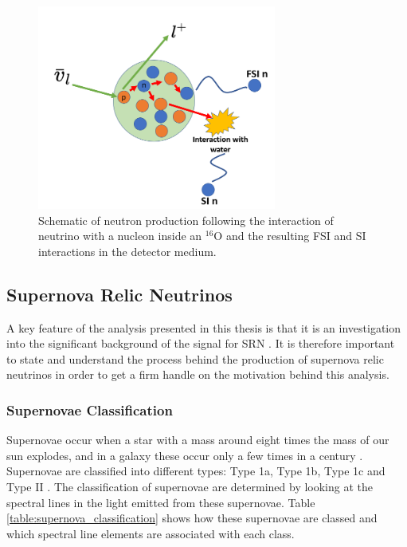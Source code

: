 \begin{figure}
    \centering
    \includegraphics[width=0.7\textwidth]{Figures/fsi_schematic.png}
    \caption{Schematic of neutron production following the interaction of neutrino with a nucleon inside an ${ }^{16} \mathrm{O}$ and the resulting FSI and SI interactions in the detector medium.}
    \label{fig:FSI_SI}
\end{figure}



\subsection{Supernova Relic Neutrinos}

A key feature of the analysis presented in this thesis is that it is an investigation into the significant background of the signal for SRN \cite{malek2003search}. It is therefore important to state and understand the process behind the production of supernova relic neutrinos in order to get a firm handle on the motivation behind this analysis. 

\subsubsection{Supernovae Classification}
Supernovae occur when a star with a mass around eight times the mass of our sun explodes, and in a galaxy these occur only a few times in a century \cite{van1991supernova}. Supernovae are classified into different types: Type 1a, Type 1b, Type 1c and Type II \cite{turatto2003classification}. The classification of supernovae are determined by looking at the spectral lines in the light emitted from these supernovae. Table \ref{table:supernova_classification} shows how these supernovae are classed and which spectral line elements are associated with each class. 

